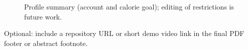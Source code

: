 \begin{figure}[!htb]
\centering
{}
\caption{Profile summary (account and calorie goal); editing of restrictions is future work.}
\label{fig:profile}
\end{figure}

Optional: include a repository URL or short demo video link in the final PDF footer or abstract footnote.
